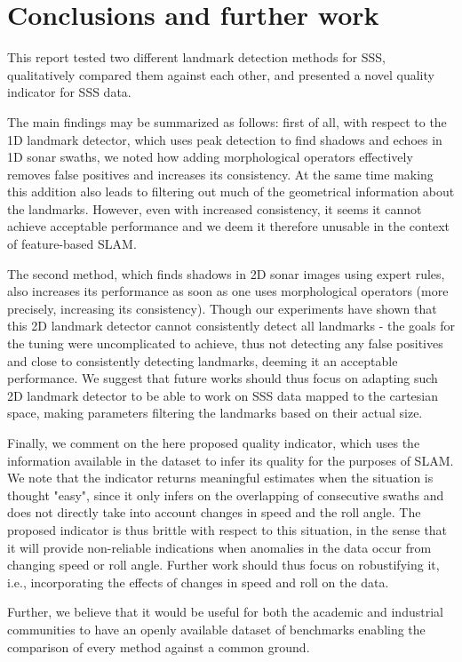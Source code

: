 \chapter{Conclusions and further work}

This report tested two different landmark detection methods for SSS, qualitatively compared them against each other, and presented a novel quality indicator for SSS data. 

The main findings may be summarized as follows: first of all, with respect to the 1D landmark detector, which uses peak detection to find shadows and echoes in 1D sonar swaths, we noted how adding morphological operators effectively removes false positives and increases its consistency. At the same time making this addition also leads to filtering out much of the geometrical information about the landmarks. However, even with increased consistency, it seems it cannot achieve acceptable performance and we deem it therefore unusable in the context of feature-based SLAM.

The second method, which finds shadows in 2D sonar images using expert rules, also increases its performance as soon as one uses morphological operators (more precisely, increasing its consistency). Though our experiments have shown that this 2D landmark detector cannot consistently detect all landmarks - the goals for the tuning were uncomplicated to achieve, thus not detecting any false positives and close to consistently detecting landmarks, deeming it an acceptable performance. We suggest that future works should thus focus on adapting such 2D landmark detector to be able to work on SSS data mapped to the cartesian space, making parameters filtering the landmarks based on their actual size. 

Finally, we comment on the here proposed quality indicator, which uses the information available in the dataset to infer its quality for the purposes of SLAM. We note that the indicator returns meaningful estimates when the situation is thought "easy", since it only infers on the overlapping of consecutive swaths and does not directly take into account changes in speed and the roll angle. The proposed indicator is thus brittle with respect to this situation, in the sense that it will provide non-reliable indications when anomalies in the data occur from changing speed or roll angle. Further work should thus focus on robustifying it, i.e., incorporating the effects of changes in speed and roll on the data. 

Further, we believe that it would be useful for both the academic and industrial communities to have an openly available dataset of benchmarks enabling the comparison of every method against a common ground.







